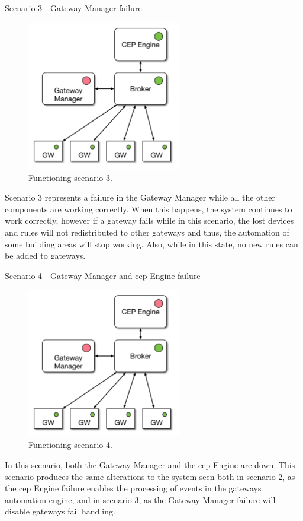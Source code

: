 \begin{Paragraph}{Scenario 3 - Gateway Manager failure}
	\begin{figure}[H]
		\centering
		\includegraphics[width=0.6\textwidth]{figures/fs5.png}
		\caption{Functioning scenario 3.}
		\label{fig:fs5}
	\end{figure}

Scenario 3 represents a failure in the Gateway Manager while all the other components are working correctly. When this happens, the system continues to work correctly, however if a gateway fails while in this scenario, the lost devices and rules will not redistributed to other gateways and thus, the automation of some building areas will stop working. Also, while in this state, no new rules can be added to gateways.


\end{Paragraph}



\begin{Paragraph}{Scenario 4 - Gateway Manager and \ac{cep} Engine failure}
\begin{figure}[H]
	\centering
	\includegraphics[width=0.6\textwidth]{figures/fs4.png}
	\caption{Functioning scenario 4.}
	\label{fig:fs4}
\end{figure}

In this scenario, both the Gateway Manager and the \ac{cep} Engine are down. This scenario produces the same alterations to the system seen both in scenario 2, as the \ac{cep} Engine failure enables the processing of events in the gateways automation engine, and in scenario 3, as the Gateway Manager failure will disable gateways fail handling.



\end{Paragraph}


